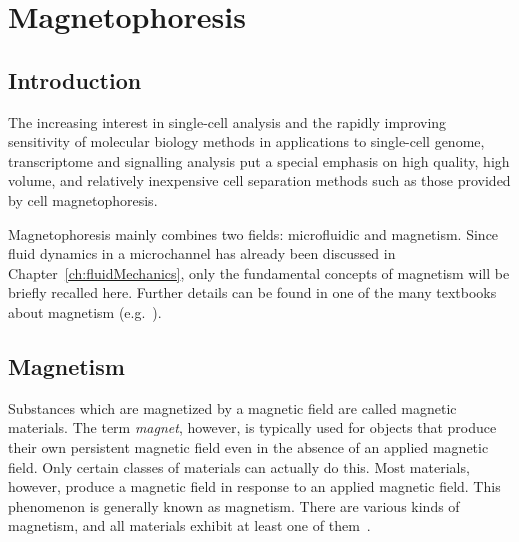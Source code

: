 \chapter{Magnetophoresis}\label{ch:magnetophoresis}


\section{Introduction}\label{sec:introductionMagneticParticle}
The increasing interest in single-cell analysis and the rapidly improving sensitivity of molecular biology methods in applications to single-cell genome, transcriptome and signalling analysis put a special emphasis on high quality, high volume, and relatively inexpensive cell separation methods such as those provided by cell magnetophoresis.

Magnetophoresis mainly combines two fields: microfluidic and magnetism. Since fluid dynamics in a microchannel has already been discussed in Chapter~\ref{ch:fluidMechanics}, only the fundamental concepts of magnetism will be briefly recalled here. Further details can be found in one of the many textbooks about magnetism (e.g.~\cite{Morrish2001,Chikazumi1964,Jiles1998}).


\section{Magnetism}\label{sec:magnetism}
Substances which are magnetized by a magnetic field are called magnetic materials. The term \textit{magnet}, however, is typically used for objects that produce their own persistent magnetic field even in the absence of an applied magnetic field. Only certain classes of materials can actually do this. Most materials, however, produce a magnetic field in response to an applied magnetic field. This phenomenon is generally known as magnetism. There are various kinds of magnetism, and all materials exhibit at least one of them~\cite{Coey2010}.

